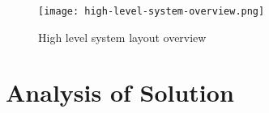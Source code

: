 

	\begin{figure}[tb]
		\begin{center}
			\texttt{[image: high-level-system-overview.png]}
		\end{center}
		\caption{High level system layout overview}
		\label{fig:hlsystem}
	\end{figure}


\section{Analysis of Solution} %
\label{sec:analysis_of_solution}



